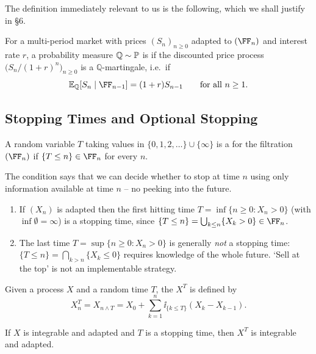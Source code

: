 \documentclass[a4paper]{scrartcl}
\newcommand{\QQ}{\mathbb{Q}}
\begin{document}
The definition immediately relevant to us is the following, which we shall justify in \S6.

\begin{definition}
	For a multi-period market with prices $(S_n)_{n\geq0}$ adapted to $(\FF_n)$ and interest rate $r$, a probability measure $\QQ\sim\PP$ is  if the discounted price process $\big(S_n/(1+r)^n\big)_{n \geq 0}$ is a $\QQ$-martingale, i.e.\ if
	$$
	\EE_\QQ[S_n \mid \FF_{n-1}] = (1+r)S_{n-1}\qquad \text{for all } n\geq1.
	$$
\end{definition}

\subsection{Stopping Times and Optional Stopping}

\begin{definition}
	A random variable $T$ taking values in $\{0,1,2,\dots\}\cup\{\infty\}$ is a  for the filtration $(\FF_n)$ if $\{T \leq n\}\in\FF_n$ for every $n$.
\end{definition}

The condition says that we can decide whether to stop at time $n$ using only information available at time $n$ -- no peeking into the future.

\begin{example}
	\begin{enumerate}[label=(\roman*)]
		\item If $(X_n)$ is adapted then the first hitting time $T = \inf\{n\geq 0 : X_n > 0\}$ (with $\inf\emptyset = \infty$) is a stopping time, since $\{T \leq n\} = \bigcup_{k\leq n}\{X_k > 0\}\in\FF_n$.
		\item The last time $T = \sup\{n \geq 0 : X_n > 0\}$ is generally \emph{not} a stopping time: $\{T\leq n\} = \bigcap_{k>n}\{X_k \leq 0\}$ requires knowledge of the whole future. `Sell at the top' is not an implementable strategy.
	\end{enumerate}
\end{example}

\begin{definition}
	Given a process $X$ and a random time $T$, the  $X^T$ is defined by
	$$
	X_n^T = X_{n\wedge T} = X_0 + \sum_{k=1}^n \ii_{\{k\leq T\}}(X_k - X_{k-1}).
	$$
\end{definition}

\begin{proposition}
	If $X$ is integrable and adapted and $T$ is a stopping time, then $X^T$ is integrable and adapted.
\end{proposition}
\end{document}
